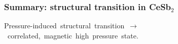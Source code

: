 

\begin{frame}[plain]
\frametitle{Summary: structural transition in CeSb$_2$}
  \mbox{\small Pressure-induced structural transition $\rightarrow$ correlated, magnetic high pressure state. }
\end{frame}



